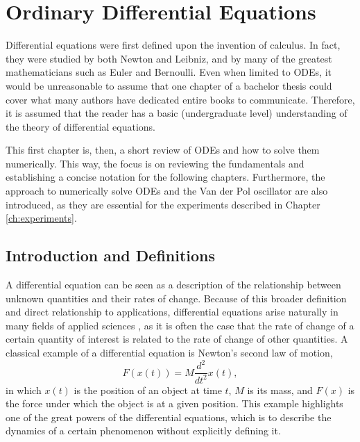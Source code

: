 \chapter{Ordinary Differential Equations}\label{ch:ode}

Differential equations were first defined upon the invention of calculus.
In fact, they were studied by both Newton and Leibniz, and by many of the greatest mathematicians such as Euler and Bernoulli.
Even when limited to \gls{ODE}s, it would be unreasonable to assume that one chapter of a bachelor thesis could cover what many authors have dedicated entire books to communicate.
Therefore, it is assumed that the reader has a basic (undergraduate level) understanding of the theory of differential equations\footnotemark.

This first chapter is, then, a short review of \gls{ODE}s and how to solve them numerically.
This way, the focus is on reviewing the fundamentals and establishing a concise notation for the following chapters.
Furthermore, the approach to numerically solve \gls{ODE}s and the Van der Pol oscillator are also introduced, as they are essential for the experiments described in Chapter \ref{ch:experiments}.

\section{Introduction and Definitions}

A differential equation can be seen as a description of the relationship between unknown quantities and their rates of change.
Because of this broader definition and direct relationship to applications, differential equations arise naturally in many fields of applied sciences \cite{hairer_solving_1993}, as it is often the case that the rate of change of a certain quantity of interest is related to the rate of change of other quantities.
A classical example of a differential equation is Newton's second law of motion, 
\begin{equation}
   F\left( x\left( t \right) \right) = M \frac{d^2}{d t^2} x(t) \label{eq:newton}
,\end{equation}
in which $x\left( t \right) $ is the position of an object at time $t$, $M$ is its mass, and $F(x)$ is the force under which the object is at a given position.
This example highlights one of the great powers of the differential equations, which is to describe the dynamics of a certain phenomenon without explicitly defining it.


